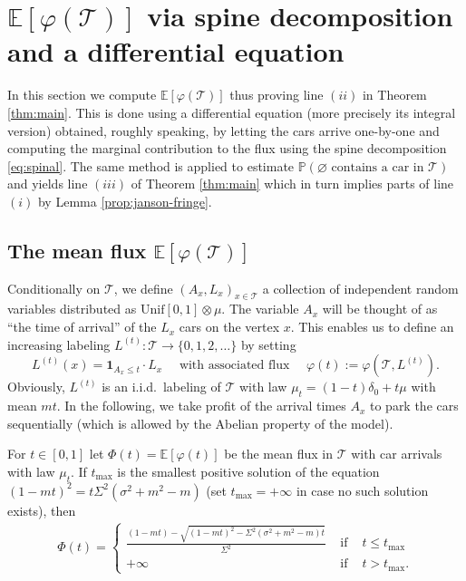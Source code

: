 \section{$ \mathbb{E}[\varphi( \mathcal{T})]$ via spine decomposition and a differential equation}
In this section we compute $ \mathbb{E}[\varphi( \mathcal{T})]$ thus proving line $(ii)$ in Theorem \ref{thm:main}. This is done using a differential equation (more precisely its integral version) obtained, roughly speaking, by letting the cars arrive one-by-one and computing the marginal contribution to the flux using the spine decomposition \eqref{eq:spinal}. The same method is applied to estimate $\mathbb{P}( \varnothing \mbox{ contains a car in } \mathcal{T})$ and yields line $(iii)$ of Theorem \ref{thm:main} which in turn implies parts of line $(i)$ by Lemma \ref{prop:janson-fringe}.

\subsection{The mean flux $ \mathbb{E}[\varphi( \mathcal{T})]$}
Conditionally on $\mathcal T$, we define $( A_x, L_x)_{x \in \mathcal{T}}$ a collection of independent random variables distributed as $ \mathrm{Unif}[0,1] \otimes \mu$. The variable $ {A}_{x}$ will be thought of as ``the time of arrival'' of the $ {L}_{x}$ cars on the vertex $x$. This enables us to define an increasing labeling $L^{(t)} : \mathcal{T} \to \{0,1,2, \dots \}$ by setting 
 $$ L^{(t)} (x)= \mathbf{1}_{ {A}_{x} \leq t} \cdot {L}_{x} \quad \mbox{ with associated flux } \quad \varphi(t) := \varphi( \mathcal{T}, L^{(t)}).$$
 Obviously, $ L^{(t)}$ is an i.i.d.~labeling of $ \mathcal{T}$ with law $\mu_t= (1-t) \delta_0 + t \mu$ with mean  $mt$. %
In the following, we take profit of the arrival times $A_{x}$ to park the cars sequentially (which is allowed by the Abelian property of the model).  
 \begin{proposition} \label{prop:meanflux} For $t \in [0,1]$ let  $  \varPhi(t) = \mathbb{E}[\varphi(t)]$ be the mean flux in $\mathcal{T}$ with car arrivals with law $\mu_t$. If $t_{\max}$ is the smallest positive solution of the equation $(1-mt)^2=t\Sigma^2 (\sigma^2 +m^2-m)$ (set $t_{\max}=+\infty$ in case no such solution exists), then 
  \begin{eqnarray} \varPhi(t) = \left\{\begin{array}{lcc}
  \displaystyle\frac{(1-mt) - \sqrt{(1-mt)^2- \Sigma^2 (\sigma^2 +m^2-m) t }}{\Sigma^2} & \mbox{ if }& t \leq t_{\max}\\
 +\infty & \mbox{ if } & t> t_{\max}. \end{array}\right. \label{eq:f(t)}  \end{eqnarray}
 \end{proposition}
 
